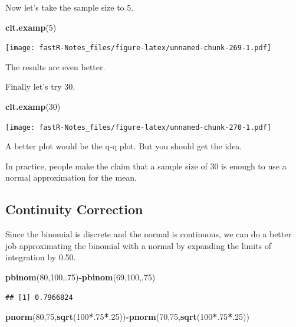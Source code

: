 \documentclass[]{book}
\newenvironment{Shaded}{\begin{snugshade}}{\end{snugshade}}
\newcommand{\KeywordTok}[1]{\textcolor[rgb]{0.13,0.29,0.53}{\textbf{#1}}}
\newcommand{\DecValTok}[1]{\textcolor[rgb]{0.00,0.00,0.81}{#1}}
\newcommand{\OperatorTok}[1]{\textcolor[rgb]{0.81,0.36,0.00}{\textbf{#1}}}
\newcommand{\NormalTok}[1]{#1}
\theoremstyle{definition}
\theoremstyle{definition}
\theoremstyle{definition}
\theoremstyle{remark}
\begin{document}
Now let's take the sample size to 5.

\begin{Shaded}
\begin{Highlighting}[]
\KeywordTok{clt.examp}\NormalTok{(}\DecValTok{5}\NormalTok{)}
\end{Highlighting}
\end{Shaded}

\texttt{[image: fastR-Notes\_files/figure-latex/unnamed-chunk-269-1.pdf]}

The results are even better.

Finally let's try 30.

\begin{Shaded}
\begin{Highlighting}[]
\KeywordTok{clt.examp}\NormalTok{(}\DecValTok{30}\NormalTok{)}
\end{Highlighting}
\end{Shaded}

\texttt{[image: fastR-Notes\_files/figure-latex/unnamed-chunk-270-1.pdf]}

A better plot would be the q-q plot. But you should get the idea.

In practice, people make the claim that a sample size of 30 is enough to
use a normal approximation for the mean.

\subsection{Continuity Correction}\label{continuity-correction}

Since the binomial is discrete and the normal is continuous, we can do a
better job approximating the binomial with a normal by expanding the
limits of integration by 0.50.

\begin{Shaded}
\begin{Highlighting}[]
\KeywordTok{pbinom}\NormalTok{(}\DecValTok{80}\NormalTok{,}\DecValTok{100}\NormalTok{,.}\DecValTok{75}\NormalTok{)}\OperatorTok{-}\KeywordTok{pbinom}\NormalTok{(}\DecValTok{69}\NormalTok{,}\DecValTok{100}\NormalTok{,.}\DecValTok{75}\NormalTok{)}
\end{Highlighting}
\end{Shaded}

\begin{verbatim}
## [1] 0.7966824
\end{verbatim}

\begin{Shaded}
\begin{Highlighting}[]
\KeywordTok{pnorm}\NormalTok{(}\DecValTok{80}\NormalTok{,}\DecValTok{75}\NormalTok{,}\KeywordTok{sqrt}\NormalTok{(}\DecValTok{100}\OperatorTok{*}\NormalTok{.}\DecValTok{75}\OperatorTok{*}\NormalTok{.}\DecValTok{25}\NormalTok{))}\OperatorTok{-}\KeywordTok{pnorm}\NormalTok{(}\DecValTok{70}\NormalTok{,}\DecValTok{75}\NormalTok{,}\KeywordTok{sqrt}\NormalTok{(}\DecValTok{100}\OperatorTok{*}\NormalTok{.}\DecValTok{75}\OperatorTok{*}\NormalTok{.}\DecValTok{25}\NormalTok{))}
\end{Highlighting}
\end{Shaded}
\end{document}
